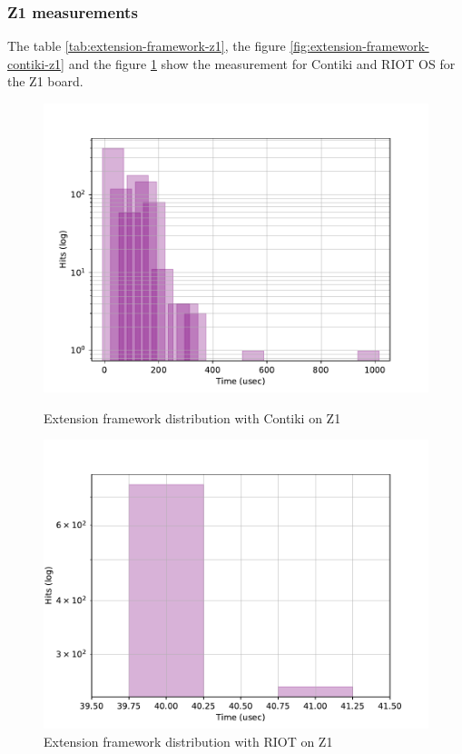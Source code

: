\subsubsection{Z1 measurements}
The table \ref{tab:extension-framework-z1}, the figure \ref{fig:extension-framework-contiki-z1} and the figure \ref{fig:extension-framework-riot-z1} show the measurement for Contiki and RIOT OS for the Z1 board.



\begin{figure}[!ht]
  \begin{minipage}{.45\textwidth}
      \centering
      \includegraphics[scale=.4]{assets/extension-framework-contiki-z1.pdf}
      \caption{Extension framework distribution with Contiki on Z1\label{fig:extension-framework-contiki-z1}}
  \end{minipage}\hfill
  \begin{minipage}{.45\textwidth}        
      \centering
      \includegraphics[scale=.4]{assets/extension-framework-riot-z1.pdf}
      \caption{Extension framework distribution with RIOT on Z1\label{fig:extension-framework-riot-z1}}
  \end{minipage}
\end{figure}


